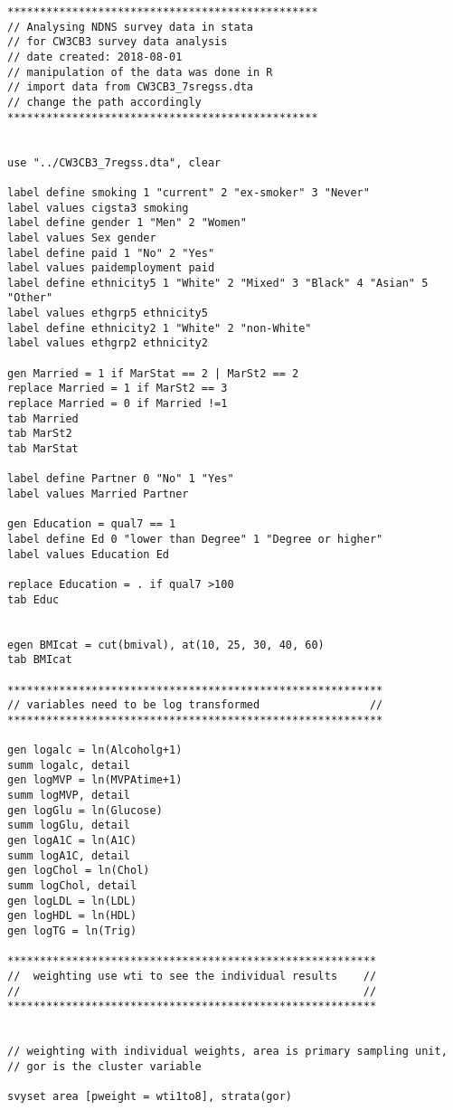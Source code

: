 



\begin{verbatim}
************************************************
// Analysing NDNS survey data in stata
// for CW3CB3 survey data analysis 
// date created: 2018-08-01
// manipulation of the data was done in R
// import data from CW3CB3_7sregss.dta
// change the path accordingly
************************************************


use "../CW3CB3_7regss.dta", clear

label define smoking 1 "current" 2 "ex-smoker" 3 "Never"
label values cigsta3 smoking
label define gender 1 "Men" 2 "Women"
label values Sex gender
label define paid 1 "No" 2 "Yes"
label values paidemployment paid
label define ethnicity5 1 "White" 2 "Mixed" 3 "Black" 4 "Asian" 5 "Other"
label values ethgrp5 ethnicity5
label define ethnicity2 1 "White" 2 "non-White"
label values ethgrp2 ethnicity2

gen Married = 1 if MarStat == 2 | MarSt2 == 2 
replace Married = 1 if MarSt2 == 3
replace Married = 0 if Married !=1
tab Married
tab MarSt2
tab MarStat

label define Partner 0 "No" 1 "Yes"
label values Married Partner

gen Education = qual7 == 1
label define Ed 0 "lower than Degree" 1 "Degree or higher"
label values Education Ed

replace Education = . if qual7 >100
tab Educ


egen BMIcat = cut(bmival), at(10, 25, 30, 40, 60)
tab BMIcat

**********************************************************
// variables need to be log transformed                 //
**********************************************************

gen logalc = ln(Alcoholg+1)
summ logalc, detail
gen logMVP = ln(MVPAtime+1)
summ logMVP, detail
gen logGlu = ln(Glucose)
summ logGlu, detail
gen logA1C = ln(A1C)
summ logA1C, detail
gen logChol = ln(Chol)
summ logChol, detail
gen logLDL = ln(LDL)
gen logHDL = ln(HDL)
gen logTG = ln(Trig)

*********************************************************
//  weighting use wti to see the individual results    //
//                                                     //
*********************************************************


// weighting with individual weights, area is primary sampling unit, 
// gor is the cluster variable

svyset area [pweight = wti1to8], strata(gor)


\end{verbatim}

